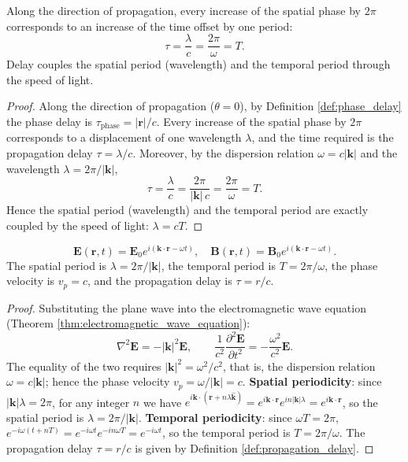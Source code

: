 \begin{proposition}\label{prop:delay_phase_unity}
Along the direction of propagation, every increase of the spatial phase by $2\pi$ corresponds to an increase of the time offset by one period:
\[
\tau = \frac{\lambda}{c} = \frac{2\pi}{\omega} = T.
\]
Delay couples the spatial period (wavelength) and the temporal period through the speed of light.
\end{proposition}

\begin{proof}
Along the direction of propagation ($\theta=0$), by Definition \ref{def:phase_delay} the phase delay is $\tau_{\text{phase}} = |\mathbf{r}|/c$. Every increase of the spatial phase by $2\pi$ corresponds to a displacement of one wavelength $\lambda$, and the time required is the propagation delay $\tau = \lambda/c$. Moreover, by the dispersion relation $\omega = c|\mathbf{k}|$ and the wavelength $\lambda = 2\pi/|\mathbf{k}|$,
\[
\tau = \frac{\lambda}{c} = \frac{2\pi}{|\mathbf{k}|\,c} = \frac{2\pi}{\omega} = T.
\]
Hence the spatial period (wavelength) and the temporal period are exactly coupled by the speed of light: $\lambda = cT$.
\end{proof}

\begin{proposition}\label{prop:plane_wave_periodic}
\[
\mathbf{E}(\mathbf{r}, t) = \mathbf{E}_0 e^{i(\mathbf{k} \cdot \mathbf{r} - \omega t)}, \quad \mathbf{B}(\mathbf{r}, t) = \mathbf{B}_0 e^{i(\mathbf{k} \cdot \mathbf{r} - \omega t)}.
\]
The spatial period is $\lambda = 2\pi/|\mathbf{k}|$, the temporal period is $T = 2\pi/\omega$, the phase velocity is $v_p = c$, and the propagation delay is $\tau = r/c$.
\end{proposition}

\begin{proof}
Substituting the plane wave into the electromagnetic wave equation (Theorem \ref{thm:electromagnetic_wave_equation}):
\[
\nabla^2\mathbf{E} = -|\mathbf{k}|^2\mathbf{E}, \qquad \frac{1}{c^2}\frac{\partial^2\mathbf{E}}{\partial t^2} = -\frac{\omega^2}{c^2}\mathbf{E}.
\]
The equality of the two requires $|\mathbf{k}|^2 = \omega^2/c^2$, that is, the dispersion relation $\omega = c|\mathbf{k}|$; hence the phase velocity $v_p = \omega/|\mathbf{k}| = c$. \textbf{Spatial periodicity}: since $|\mathbf{k}|\lambda = 2\pi$, for any integer $n$ we have $e^{i\mathbf{k}\cdot(\mathbf{r}+n\lambda\hat{\mathbf{k}})} = e^{i\mathbf{k}\cdot\mathbf{r}}e^{i n|\mathbf{k}|\lambda} = e^{i\mathbf{k}\cdot\mathbf{r}}$, so the spatial period is $\lambda = 2\pi/|\mathbf{k}|$. \textbf{Temporal periodicity}: since $\omega T = 2\pi$, $e^{-i\omega(t+nT)} = e^{-i\omega t}e^{-i n\omega T} = e^{-i\omega t}$, so the temporal period is $T = 2\pi/\omega$. The propagation delay $\tau = r/c$ is given by Definition \ref{def:propagation_delay}.
\end{proof}

